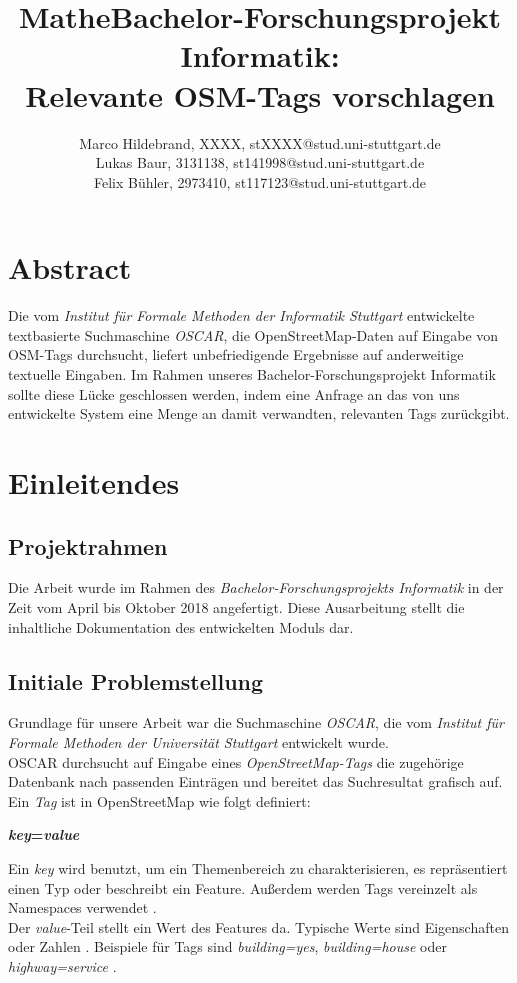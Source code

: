 \documentclass[12pt,pdftex,a4paper]{article}
\title{Mathe}
\begin{document}
\title{Bachelor-Forschungsprojekt Informatik:\\Relevante OSM-Tags vorschlagen}
\author{Marco Hildebrand, XXXX, stXXXX@stud.uni-stuttgart.de\\
		Lukas Baur, 3131138, st141998@stud.uni-stuttgart.de\\
		Felix Bühler, 2973410, st117123@stud.uni-stuttgart.de}
\maketitle


\section*{Abstract}
Die vom \textit{Institut für Formale Methoden der Informatik Stuttgart} entwickelte textbasierte Suchmaschine \textit{OSCAR}, die OpenStreetMap-Daten auf Eingabe von OSM-Tags durchsucht, liefert unbefriedigende Ergebnisse auf anderweitige textuelle Eingaben. 
Im Rahmen unseres Bachelor-Forschungsprojekt Informatik sollte diese Lücke geschlossen werden, indem eine Anfrage an das von uns entwickelte System eine Menge an damit verwandten, relevanten Tags zurückgibt.

\pagebreak

\section{Einleitendes}
\subsection{Projektrahmen}
Die Arbeit wurde im Rahmen des \textit{Bachelor-Forschungsprojekts Informatik} in der Zeit vom April bis Oktober 2018 angefertigt. Diese Ausarbeitung stellt die inhaltliche Dokumentation des entwickelten Moduls dar.
\subsection{Initiale Problemstellung}
Grundlage für unsere Arbeit war die Suchmaschine \textit{OSCAR}, die vom \textit{Institut für Formale Methoden der Universität Stuttgart} entwickelt wurde.\\
OSCAR durchsucht auf Eingabe eines \textit{OpenStreetMap-Tags} die  zugehörige Datenbank nach passenden Einträgen und bereitet das Suchresultat grafisch auf. Ein \textit{Tag} ist in OpenStreetMap wie folgt definiert:
\begin{center}
	\textbf{\textit{key}=\textit{value}}
\end{center}
Ein \textit{key} wird benutzt, um ein Themenbereich zu charakterisieren, es repräsentiert einen Typ oder beschreibt ein Feature. Außerdem werden Tags vereinzelt als Namespaces verwendet \cite{keyDescription}.\\
Der \textit{value}-Teil stellt ein Wert des Features da. Typische Werte sind Eigenschaften oder Zahlen \cite{keyDescription}.
Beispiele für Tags sind \textit{building=yes}, \textit{building=house} oder  \textit{highway=service} \cite{example1}\cite{example2}.\\
\end{document}
